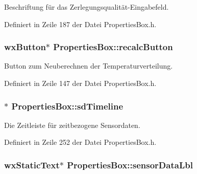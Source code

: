 Beschriftung für das Zerlegungsqualität-\/\-Eingabefeld. 



Definiert in Zeile 187 der Datei Properties\-Box.\-h.

\hypertarget{classPropertiesBox_a0f5356371cde511efeb413bc2a98e6fc}{
\subsubsection[{recalc\-Button}]{\setlength{\rightskip}{0pt plus 5cm}wx\-Button$\ast$ Properties\-Box\-::recalc\-Button\hspace{0.3cm}{\ttfamily [private]}}}\label{classPropertiesBox_a0f5356371cde511efeb413bc2a98e6fc}


Button zum Neuberechnen der Temperaturverteilung. 



Definiert in Zeile 147 der Datei Properties\-Box.\-h.

\hypertarget{classPropertiesBox_ab145e0c36e99d355f2722964da46b31a}{
\subsubsection[{sd\-Timeline}]{$\ast$ Properties\-Box\-::sd\-Timeline\hspace{0.3cm}{\ttfamily [private]}}}\label{classPropertiesBox_ab145e0c36e99d355f2722964da46b31a}


Die Zeitleiste für zeitbezogene Sensordaten. 



Definiert in Zeile 252 der Datei Properties\-Box.\-h.

\hypertarget{classPropertiesBox_ab9b6df8a3367b4b5b56ef82ab1bd7aa3}{
\subsubsection[{sensor\-Data\-Lbl}]{\setlength{\rightskip}{0pt plus 5cm}wx\-Static\-Text$\ast$ Properties\-Box\-::sensor\-Data\-Lbl\hspace{0.3cm}{\ttfamily [private]}}}\label{classPropertiesBox_ab9b6df8a3367b4b5b56ef82ab1bd7aa3}


